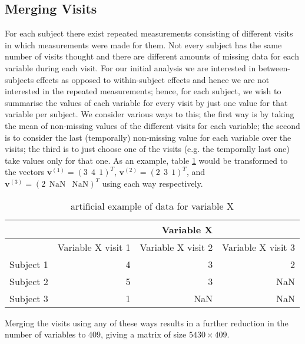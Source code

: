 \documentclass{article}
\begin{document}
\subsection*{Merging Visits}
For each subject there exist repeated measurements consisting of different visits in which measurements were made for them. Not every subject has the same number of visits thought and there are different amounts of missing data for each variable during each visit. For our initial analysis we are interested in between-subjects effects as opposed to within-subject effects and hence we are not interested in the repeated measurements; hence, for each subject, we wish to summarise the values of each variable for every visit by just one value for that variable per subject. We consider various ways to this; the first way is by taking the mean of non-missing values of the different visits for each variable; the second is to consider the last (temporally) non-missing value for each variable over the visits; the third is to just choose one of the visits (e.g. the temporally last one) take values only for that one. As an example, table \ref{table:visits} would be transformed to the vectors $\bm{v}^{(1)} =(3 \ \ 4 \ \ 1)^T$, $\bm{v}^{(2)} =(2 \ \ 3 \ \ 1)^T$, and $\bm{v}^{(3)} =(2 \ \ \text{NaN} \ \ \text{ NaN})^T$ using each way respectively. 
\begin{table}
\centering
\begin{tabular} {|r|rrr|}
\hline
& & Variable X & \\
\hline
& Variable X visit 1 & Variable X visit 2  & Variable X visit 3 \\
\hline
Subject 1 & 4 & 3  & 2 \\ 
Subject 2 & 5 & 3 & NaN \\
Subject 3 & 1 & NaN & NaN \\
\hline
\end{tabular}
\caption{artificial example of data for variable X}
\label{table:visits}
\end{table}  
Merging the visits using any of these ways results in a further reduction in the number of variables to 409, giving a matrix of size $5430\times 409$. 
\end{document}
